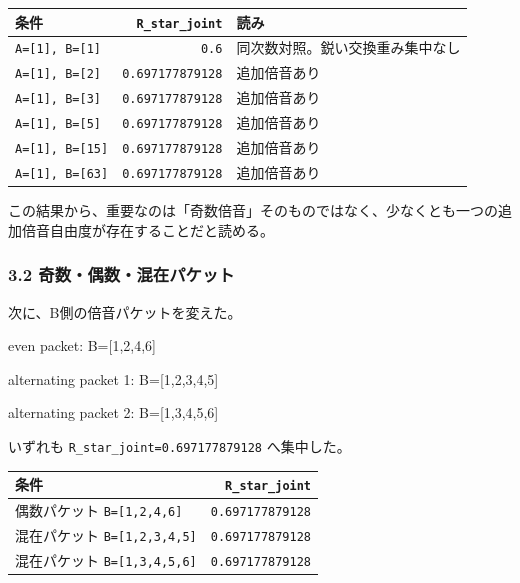 \documentclass[
]{article}
\newenvironment{Shaded}{}{}
\newcommand{\NormalTok}[1]{#1}
\newcounter{none} %
\begin{document}
{\def\LTcaptype{none} %
\begin{longtable}[]{@{}lrl@{}}
\toprule\noalign{}
条件 & \texttt{R\_star\_joint} & 読み \\
\midrule\noalign{}
\endhead
\bottomrule\noalign{}
\endlastfoot
\texttt{A={[}1{]},\ B={[}1{]}} & \texttt{0.6} &
同次数対照。鋭い交換重み集中なし \\
\texttt{A={[}1{]},\ B={[}2{]}} & \texttt{0.697177879128} &
追加倍音あり \\
\texttt{A={[}1{]},\ B={[}3{]}} & \texttt{0.697177879128} &
追加倍音あり \\
\texttt{A={[}1{]},\ B={[}5{]}} & \texttt{0.697177879128} &
追加倍音あり \\
\texttt{A={[}1{]},\ B={[}15{]}} & \texttt{0.697177879128} &
追加倍音あり \\
\texttt{A={[}1{]},\ B={[}63{]}} & \texttt{0.697177879128} &
追加倍音あり \\
\end{longtable}
}

この結果から、重要なのは「奇数倍音」そのものではなく、少なくとも一つの追加倍音自由度が存在することだと読める。

\subsubsection{3.2
奇数・偶数・混在パケット}\label{ux5947ux6570ux5076ux6570ux6df7ux5728ux30d1ux30b1ux30c3ux30c8}

次に、B側の倍音パケットを変えた。

\begin{Shaded}
\begin{Highlighting}[]
\NormalTok{even packet:}
\NormalTok{  B=[1,2,4,6]}

\NormalTok{alternating packet 1:}
\NormalTok{  B=[1,2,3,4,5]}

\NormalTok{alternating packet 2:}
\NormalTok{  B=[1,3,4,5,6]}
\end{Highlighting}
\end{Shaded}

いずれも \texttt{R\_star\_joint=0.697177879128} へ集中した。

{\def\LTcaptype{none} %
\begin{longtable}[]{@{}lr@{}}
\toprule\noalign{}
条件 & \texttt{R\_star\_joint} \\
\midrule\noalign{}
\endhead
\bottomrule\noalign{}
\endlastfoot
偶数パケット \texttt{B={[}1,2,4,6{]}} & \texttt{0.697177879128} \\
混在パケット \texttt{B={[}1,2,3,4,5{]}} & \texttt{0.697177879128} \\
混在パケット \texttt{B={[}1,3,4,5,6{]}} & \texttt{0.697177879128} \\
\end{longtable}
}
\end{document}

